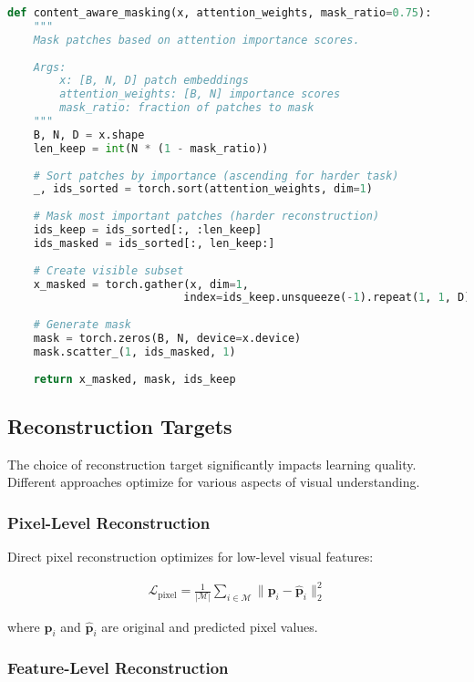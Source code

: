 \begin{lstlisting}[language=Python, caption=Content-aware masking based on patch importance]
def content_aware_masking(x, attention_weights, mask_ratio=0.75):
    """
    Mask patches based on attention importance scores.
    
    Args:
        x: [B, N, D] patch embeddings
        attention_weights: [B, N] importance scores
        mask_ratio: fraction of patches to mask
    """
    B, N, D = x.shape
    len_keep = int(N * (1 - mask_ratio))
    
    # Sort patches by importance (ascending for harder task)
    _, ids_sorted = torch.sort(attention_weights, dim=1)
    
    # Mask most important patches (harder reconstruction)
    ids_keep = ids_sorted[:, :len_keep]
    ids_masked = ids_sorted[:, len_keep:]
    
    # Create visible subset
    x_masked = torch.gather(x, dim=1,
                           index=ids_keep.unsqueeze(-1).repeat(1, 1, D))
    
    # Generate mask
    mask = torch.zeros(B, N, device=x.device)
    mask.scatter_(1, ids_masked, 1)
    
    return x_masked, mask, ids_keep
\end{lstlisting}

\subsection{Reconstruction Targets}

The choice of reconstruction target significantly impacts learning quality. Different approaches optimize for various aspects of visual understanding.

\subsubsection{Pixel-Level Reconstruction}

Direct pixel reconstruction optimizes for low-level visual features:

\begin{align}
\mathcal{L}_{\text{pixel}} = \frac{1}{|\mathcal{M}|} \sum_{i \in \mathcal{M}} \|\mathbf{p}_i - \hat{\mathbf{p}}_i\|_2^2
\end{align}

where $\mathbf{p}_i$ and $\hat{\mathbf{p}}_i$ are original and predicted pixel values.

\subsubsection{Feature-Level Reconstruction}

